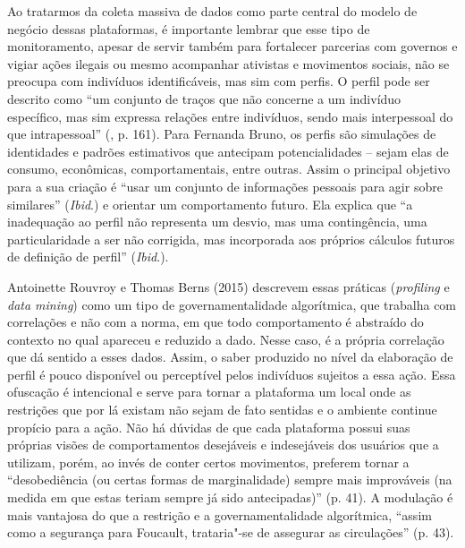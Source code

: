 Ao tratarmos da coleta massiva de dados como parte central do modelo de
negócio dessas plataformas, é importante lembrar que esse tipo de
monitoramento, apesar de servir também para fortalecer parcerias com
governos e vigiar ações ilegais ou mesmo acompanhar ativistas e
movimentos sociais, não se preocupa com indivíduos identificáveis, mas
sim com perfis. O perfil pode ser descrito como ``um conjunto de traços
que não concerne a um indivíduo específico, mas sim expressa relações
entre indivíduos, sendo mais interpessoal do que intrapessoal'' (, p.
161). Para Fernanda Bruno, os perfis são simulações de identidades e
padrões estimativos que antecipam potencialidades ­-- sejam elas de
consumo, econômicas, comportamentais, entre outras. Assim o principal
objetivo para a sua criação é ``usar um conjunto de informações pessoais
para agir sobre similares'' (\emph{Ibid}.) e orientar um comportamento futuro.
Ela explica que ``a inadequação ao perfil não representa um desvio, mas
uma contingência, uma particularidade a ser não corrigida, mas
incorporada aos próprios cálculos futuros de definição de
perfil'' (\emph{Ibid}.).

Antoinette Rouvroy e Thomas Berns (2015) descrevem essas práticas
(\emph{profiling} e \emph{data mining}) como um tipo de
governamentalidade algorítmica, que trabalha com correlações e não com a
norma, em que todo comportamento é abstraído do contexto no qual
apareceu e reduzido a dado. Nesse caso, é a própria correlação que dá
sentido a esses dados. Assim, o saber produzido no nível da elaboração
de perfil é pouco disponível ou perceptível pelos indivíduos sujeitos a
essa ação. Essa ofuscação é intencional e serve para tornar a plataforma
um local onde as restrições que por lá existam não sejam de fato
sentidas e o ambiente continue propício para a ação. Não há dúvidas de
que cada plataforma possui suas próprias visões de comportamentos
desejáveis e indesejáveis dos usuários que a utilizam, porém, ao invés
de conter certos movimentos, preferem tornar a ``desobediência (ou
certas formas de marginalidade) sempre mais improváveis (na medida em
que estas teriam sempre já sido antecipadas)'' (p. 41). A modulação é mais
vantajosa do que a restrição e a governamentalidade algorítmica, ``assim
como a segurança para Foucault, trataria"-se de assegurar as
circulações'' (p. 43).

